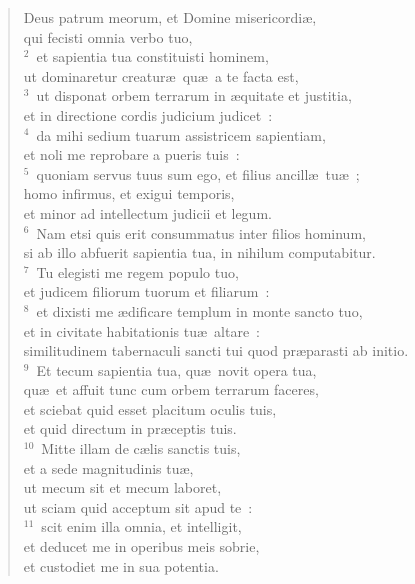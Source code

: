 \begin{flushleft}\begin{verse}\vspace{-19pt}Deus patrum meorum, et Domine misericordi\ae ,\\ qui fecisti omnia verbo tuo,\\
${}^{2}$~et sapientia tua constituisti hominem,\\ ut dominaretur creatur\ae\ qu\ae\ a te facta est,\\
${}^{3}$~ut disponat orbem terrarum in \ae quitate et justitia,\\ et in directione cordis judicium judicet~:\\
${}^{4}$~da mihi sedium tuarum assistricem sapientiam,\\ et noli me reprobare a pueris tuis~:\\
${}^{5}$~quoniam servus tuus sum ego, et filius ancill\ae\ tu\ae~;\\ homo infirmus, et exigui temporis,\\ et minor ad intellectum judicii et legum.\\
${}^{6}$~Nam etsi quis erit consummatus inter filios hominum,\\ si ab illo abfuerit sapientia tua, in nihilum computabitur.\\
${}^{7}$~Tu elegisti me regem populo tuo,\\ et judicem filiorum tuorum et filiarum~:\\
${}^{8}$~et dixisti me \ae dificare templum in monte sancto tuo,\\ et in civitate habitationis tu\ae\ altare~:\\ similitudinem tabernaculi sancti tui quod pr\ae parasti ab initio.\\
${}^{9}$~Et tecum sapientia tua, qu\ae\ novit opera tua,\\ qu\ae\ et affuit tunc cum orbem terrarum faceres,\\ et sciebat quid esset placitum oculis tuis,\\ et quid directum in pr\ae ceptis tuis.\\
${}^{10}$~Mitte illam de c\ae lis sanctis tuis,\\ et a sede magnitudinis tu\ae ,\\ ut mecum sit et mecum laboret,\\ ut sciam quid acceptum sit apud te~:\\
${}^{11}$~scit enim illa omnia, et intelligit,\\ et deducet me in operibus meis sobrie,\\ et custodiet me in sua potentia.\\

\end{verse}
\end{flushleft}
